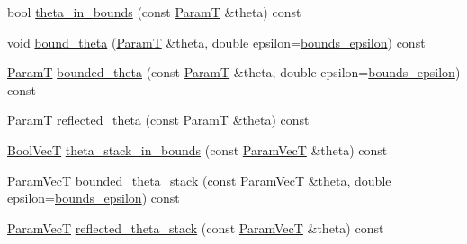 \begin{DoxyCompactItemize}
\item 
bool \hyperlink{classmappel_1_1PointEmitterModel_ad50dfc29b6e7167fb4caf8683353079d}{theta\+\_\+in\+\_\+bounds} (const \hyperlink{classmappel_1_1PointEmitterModel_a665ec6aea3aac139bb69a23c06d4b9a1}{ParamT} \&theta) const 
\item 
void \hyperlink{classmappel_1_1PointEmitterModel_a789dfcc9ea1df17a0282fca5705ade85}{bound\+\_\+theta} (\hyperlink{classmappel_1_1PointEmitterModel_a665ec6aea3aac139bb69a23c06d4b9a1}{ParamT} \&theta, double epsilon=\hyperlink{classmappel_1_1PointEmitterModel_ac987a119137b85a27704b1c40e3fab8c}{bounds\+\_\+epsilon}) const 
\item 
\hyperlink{classmappel_1_1PointEmitterModel_a665ec6aea3aac139bb69a23c06d4b9a1}{ParamT} \hyperlink{classmappel_1_1PointEmitterModel_ac342b21db8970dfa0b2809ffe5e73d06}{bounded\+\_\+theta} (const \hyperlink{classmappel_1_1PointEmitterModel_a665ec6aea3aac139bb69a23c06d4b9a1}{ParamT} \&theta, double epsilon=\hyperlink{classmappel_1_1PointEmitterModel_ac987a119137b85a27704b1c40e3fab8c}{bounds\+\_\+epsilon}) const 
\item 
\hyperlink{classmappel_1_1PointEmitterModel_a665ec6aea3aac139bb69a23c06d4b9a1}{ParamT} \hyperlink{classmappel_1_1PointEmitterModel_a7dd386776870462e8f20c646b6fed1e3}{reflected\+\_\+theta} (const \hyperlink{classmappel_1_1PointEmitterModel_a665ec6aea3aac139bb69a23c06d4b9a1}{ParamT} \&theta) const 
\item 
\hyperlink{namespacemappel_a167d761ecce3cafb6f98c00c16bdb523}{Bool\+VecT} \hyperlink{classmappel_1_1PointEmitterModel_a7b6a59b4bc796b440025cffb7a6159f8}{theta\+\_\+stack\+\_\+in\+\_\+bounds} (const \hyperlink{classmappel_1_1PointEmitterModel_add253b568d763f1513a810aac35de719}{Param\+VecT} \&theta) const 
\item 
\hyperlink{classmappel_1_1PointEmitterModel_add253b568d763f1513a810aac35de719}{Param\+VecT} \hyperlink{classmappel_1_1PointEmitterModel_a6671c06d391ae9a09dd5de78dcc636fe}{bounded\+\_\+theta\+\_\+stack} (const \hyperlink{classmappel_1_1PointEmitterModel_add253b568d763f1513a810aac35de719}{Param\+VecT} \&theta, double epsilon=\hyperlink{classmappel_1_1PointEmitterModel_ac987a119137b85a27704b1c40e3fab8c}{bounds\+\_\+epsilon}) const 
\item 
\hyperlink{classmappel_1_1PointEmitterModel_add253b568d763f1513a810aac35de719}{Param\+VecT} \hyperlink{classmappel_1_1PointEmitterModel_ae24c17017ff5e37e1dd9ea9a1aeefa7f}{reflected\+\_\+theta\+\_\+stack} (const \hyperlink{classmappel_1_1PointEmitterModel_add253b568d763f1513a810aac35de719}{Param\+VecT} \&theta) const 
\end{DoxyCompactItemize}
